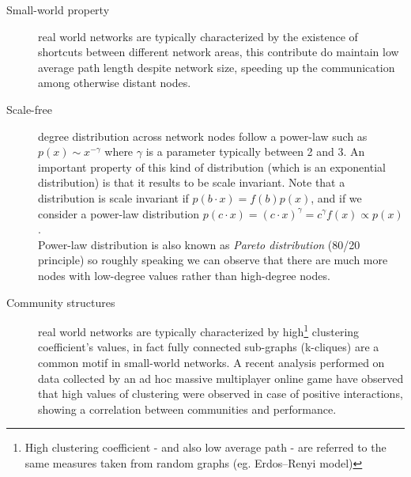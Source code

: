 \begin{description}

\item[Small-world property] real world networks are typically characterized  by the existence of shortcuts between different network areas, this contribute do maintain low average path length despite network size\cite{citeulike:481248}, speeding up the communication among otherwise distant nodes.

\item[Scale-free] degree distribution across network nodes follow a power-law such as $p(x) \sim x^{-\gamma}$ where $\gamma$ is a parameter typically between 2 and 3. An important property of this kind of distribution (which is an exponential distribution) is that it results to be scale invariant. Note that a distribution is scale invariant if $p(b \cdot x) = f(b) p(x)$, and if we consider a power-law distribution $p(c \cdot x) = (c \cdot x)^\gamma = c^\gamma f(x) \propto p(x)$.\\ 
Power-law distribution is also known as \emph{Pareto distribution} (80/20 principle) so roughly speaking we can observe that there are much more nodes with low-degree values rather than high-degree nodes.

\item[Community structures] real world networks are typically characterized by high\footnote{High clustering coefficient - and also low average path - are referred to the same measures taken from random graphs (eg. Erdos–Renyi model) } clustering coefficient's values, in fact fully connected sub-graphs (k-cliques) are a common motif in small-world networks\cite{citeulike:481248}. A recent analysis performed on data collected by an ad hoc massive multiplayer online game\cite{citeulike:6926207} have observed that high values of clustering were observed in case of positive interactions, showing a correlation between communities and performance.

\end{description}

